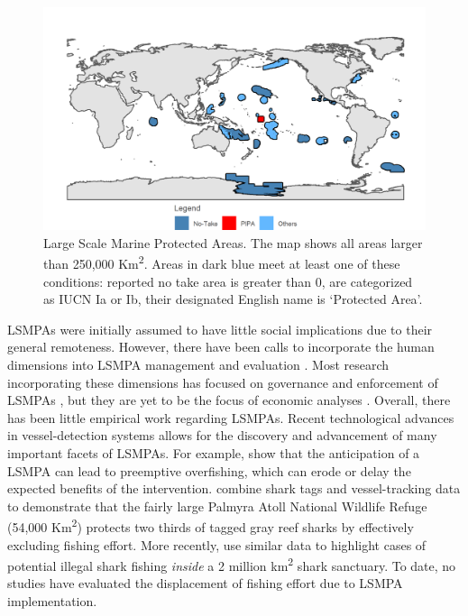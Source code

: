 \documentclass[9pt,twoside,lineno]{pnas-new}
\begin{document}
\begin{figure}
\centering
\includegraphics{img/LSMPAs_map.png}
\caption{\label{fig:LSMPAs_map}Large Scale Marine
Protected Areas. The map shows all areas larger than 250,000
Km\textsuperscript{2}. Areas in dark blue meet at least one of these
conditions: reported no take area is greater than 0, are categorized as
IUCN Ia or Ib, their designated English name is `Protected Area'.}
\end{figure}

LSMPAs were initially assumed to have little social implications due
to their general remoteness. However, there have been calls to incorporate the
human dimensions into LSMPA management and evaluation
\citep{agardy_2011,gray_2017}. Most research incorporating these
dimensions has focused on governance and enforcement of LSMPAs
\cite{alger_2017,christie_2017}, but they are yet to be
the focus of economic analyses \citep{gray_2017}. Overall, there has
been little empirical work regarding LSMPAs. Recent technological
advances in vessel-detection systems allows for the discovery and
advancement of many important facets of LSMPAs. For example,
\cite{mcdermott_2018} show that the anticipation of a LSMPA can lead to
preemptive overfishing, which can erode or delay the expected benefits
of the intervention. \cite{white_2017} combine shark tags and
vessel-tracking data to demonstrate that the fairly large Palmyra Atoll
National Wildlife Refuge (54,000 Km\textsuperscript{2}) protects two
thirds of tagged gray reef sharks by effectively excluding fishing
effort. More recently, \citep{bradley_2018} use similar data to
highlight cases of potential illegal shark fishing \emph{inside} a 2
million km\textsuperscript{2} shark sanctuary. To date, no studies have
evaluated the displacement of fishing effort due to LSMPA
implementation.
\end{document}

